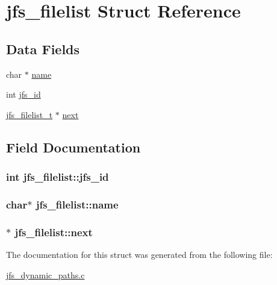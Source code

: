 \hypertarget{structjfs__filelist}{
\section{jfs\_\-filelist Struct Reference}
\label{structjfs__filelist}
}
\subsection*{Data Fields}
\begin{DoxyCompactItemize}
\item 
char $\ast$ \hyperlink{structjfs__filelist_a8f566398f5a8dde05ad75307f019c9c7}{name}
\item 
int \hyperlink{structjfs__filelist_a0f7c08a291e2aa9bc6b7bd1ddc93a28c}{jfs\_\-id}
\item 
\hyperlink{structjfs__filelist}{jfs\_\-filelist\_\-t} $\ast$ \hyperlink{structjfs__filelist_aefb59563b4088cf5678f43276f364887}{next}
\end{DoxyCompactItemize}


\subsection{Field Documentation}
\hypertarget{structjfs__filelist_a0f7c08a291e2aa9bc6b7bd1ddc93a28c}{
\subsubsection[{jfs\_\-id}]{\setlength{\rightskip}{0pt plus 5cm}int {\bf jfs\_\-filelist::jfs\_\-id}}}
\label{structjfs__filelist_a0f7c08a291e2aa9bc6b7bd1ddc93a28c}
\hypertarget{structjfs__filelist_a8f566398f5a8dde05ad75307f019c9c7}{
\subsubsection[{name}]{\setlength{\rightskip}{0pt plus 5cm}char$\ast$ {\bf jfs\_\-filelist::name}}}
\label{structjfs__filelist_a8f566398f5a8dde05ad75307f019c9c7}
\hypertarget{structjfs__filelist_aefb59563b4088cf5678f43276f364887}{
\subsubsection[{next}]{$\ast$ {\bf jfs\_\-filelist::next}}}
\label{structjfs__filelist_aefb59563b4088cf5678f43276f364887}


The documentation for this struct was generated from the following file:\begin{DoxyCompactItemize}
\item 
\hyperlink{jfs__dynamic__paths_8c}{jfs\_\-dynamic\_\-paths.c}\end{DoxyCompactItemize}
